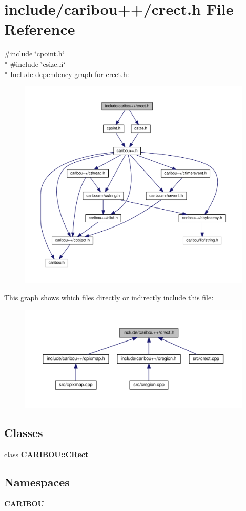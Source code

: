 \section{include/caribou++/crect.h File Reference}
\label{crect_8h}
{\ttfamily \#include \char`\"{}cpoint.\-h\char`\"{}}\\*
{\ttfamily \#include \char`\"{}csize.\-h\char`\"{}}\\*
Include dependency graph for crect.\-h\-:\nopagebreak
\begin{figure}[H]
\begin{center}
\leavevmode
\includegraphics[width=350pt]{crect_8h__incl}
\end{center}
\end{figure}
This graph shows which files directly or indirectly include this file\-:\nopagebreak
\begin{figure}[H]
\begin{center}
\leavevmode
\includegraphics[width=350pt]{crect_8h__dep__incl}
\end{center}
\end{figure}
\subsection*{Classes}
\begin{DoxyCompactItemize}
\item 
class {\bf C\-A\-R\-I\-B\-O\-U\-::\-C\-Rect}
\end{DoxyCompactItemize}
\subsection*{Namespaces}
\begin{DoxyCompactItemize}
\item 
{\bf C\-A\-R\-I\-B\-O\-U}
\end{DoxyCompactItemize}
